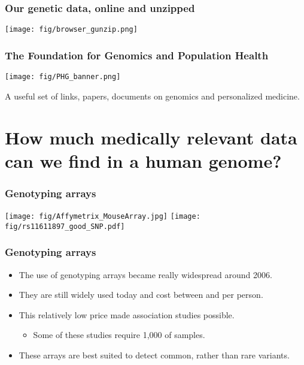 \documentclass{beamer}
\begin{document}
\begin{frame}
\frametitle{Our genetic data, online and unzipped}
  \begin{center}
    \texttt{[image: fig/browser\_gunzip.png]}
  \end{center}
\end{frame}



\begin{frame}
\frametitle{The Foundation for Genomics and Population Health}
  \begin{center}
    \texttt{[image: fig/PHG\_banner.png]}
  \end{center}
  A useful set of links, papers, documents on genomics and personalized medicine.
\end{frame}




\section{How much medically relevant data can we find in a human genome?}


\begin{frame}
  \frametitle{Genotyping arrays}
  \begin{center}
    \texttt{[image: fig/Affymetrix\_MouseArray.jpg]}
    \texttt{[image: fig/rs11611897\_good\_SNP.pdf]}
  \end{center}
\end{frame}


\begin{frame}
  \frametitle{Genotyping arrays}
  \begin{itemize}
  \item The use of genotyping arrays became really widespread around 2006.
  \item They are still widely used today and cost between  and  per person.
  \item This relatively low price made association studies possible.
    \begin{itemize}
    \item Some of these studies require 1,000 of samples.
    \end{itemize}
  \item These arrays are best suited to detect common, rather than rare variants.
  \end{itemize}
\end{frame}
\end{document}
